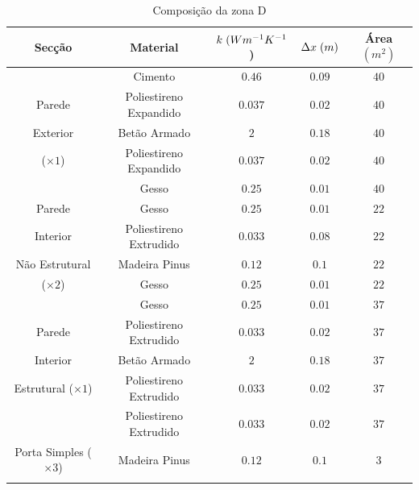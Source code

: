\documentclass[12pt, a4paper]{article}
\begin{document}
\begin{table}[htpb]
    \begin{center}
        \begin{tabular}{c c c c c}
            \toprule{}
            Sec\c{c}\~ao & Material & $ k \hspace{1mm} (Wm^{-1}K^{-1}$) & $ \Delta x \hspace{1mm} (m)$ & \'Area $(m^2) $ \\
            \midrule{}

            \multirow{5}{*}{} & Cimento & $0.46$ & $0.09$ & $40$ \\
            \cline{2-5}
            Parede & Poliestireno Expandido & $0.037$ & $0.02$ & $40$ \\
            \cline{2-5}
            Exterior & Bet\~ao Armado & $2$ & $0.18$ & $40$ \\
            \cline{2-5}
            ($\times 1$) & Poliestireno Expandido & $0.037$ & $0.02$ & $40$ \\
            \cline{2-5}
                    & Gesso & $0.25$ & $0.01$ & $40$ \\
            \midrule{}

            Parede \multirow{4}{*}{} & Gesso & $0.25$ & $0.01$ & $22$ \\
            \cline{2-5}
            Interior & Poliestireno Extrudido & $0.033$ & $0.08$ & $22$ \\
            \cline{2-5}
            N\~ao Estrutural & Madeira Pinus & $0.12$ & $0.1$ & $22$ \\
            \cline{2-5}
            ($\times2$) & Gesso & $0.25$ & $0.01$ & $22$ \\
            \midrule{}

            \multirow{5}{*}{} & Gesso & $0.25$ & $0.01$ & $37$ \\
            \cline{2-5}
            Parede & Poliestireno Extrudido & $0.033$ & $0.02$ & $37$ \\
            \cline{2-5}
            Interior & Bet\~ao Armado & $2$ & $0.18$ & $37$ \\
            \cline{2-5}
            Estrutural ($\times 1$) & Poliestireno Extrudido & $0.033$ & $0.02$ & $37$ \\
            \cline{2-5}
                    & Poliestireno Extrudido & $0.033$ & $0.02$ & $37$ \\
            \midrule{}

            Porta Simples ($\times 3$) & Madeira Pinus & $0.12$ & $0.1$ & $3$ \\
            \bottomrule{}
        \end{tabular}
    \end{center}
    \caption{Composi\c{c}\~ao da zona D}\label{tab:zona_d}
\end{table}
\end{document}
